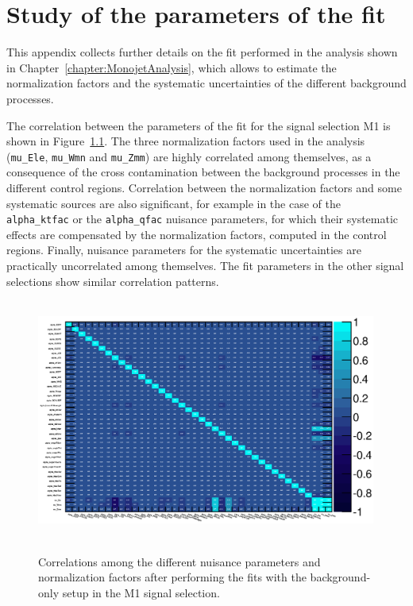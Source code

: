 \chapter{Study of the parameters of the fit}
    \label{app:FitResults}

This appendix collects further details on the fit performed in the analysis shown in Chapter~\ref{chapter:MonojetAnalysis}, which allows to estimate the normalization factors and the systematic uncertainties of the different background processes.

The correlation between the parameters of the fit for the signal selection M1 is shown in Figure~\ref{fig:corrMatrix}.
The three normalization factors used in the analysis (\texttt{mu\_Ele}, \texttt{mu\_Wmn} and \texttt{mu\_Zmm}) are highly correlated among themselves, as a consequence of the cross contamination between the background processes in the different control regions.
Correlation between the normalization factors and some systematic sources are also significant, for example in the case of the \texttt{alpha\_ktfac} or the \texttt{alpha\_qfac} nuisance parameters, for which their systematic effects are compensated by the normalization factors, computed in the control regions.
Finally, nuisance parameters for the systematic uncertainties are practically uncorrelated among themselves.
The fit parameters in the other signal selections show similar correlation patterns.

\begin{figure}[!ht]
  \begin{center}
    \mbox{
      \includegraphics[width=0.995\textwidth]{MonojetAnalysis/Figures/corrMatrix_Stop_M1.eps}
    }
  \end{center}
  \caption[Correlations among the different nuisance parameters and normalization factors after performing the fits with the background-only setup in the M1 signal selection.]{Correlations among the different nuisance parameters and normalization factors after performing the fits with the background-only setup in the M1 signal selection.}
  \label{fig:corrMatrix}
\end{figure}

